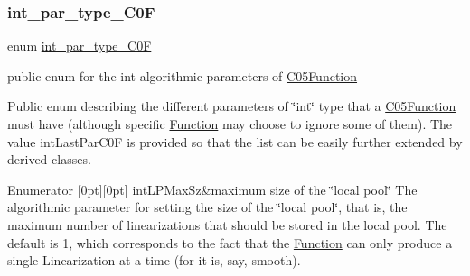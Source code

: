 \subsubsection{\texorpdfstring{int\+\_\+par\+\_\+type\+\_\+\+C0F}{int\_par\_type\_C0F}}
{\footnotesize\ttfamily enum \mbox{\hyperlink{class_s_m_spp__di__unipi__it_1_1_c05_function_acb8f83def674aa9de3dcc44cdcebc59d}{int\+\_\+par\+\_\+type\+\_\+\+C0F}}}



public enum for the int algorithmic parameters of \mbox{\hyperlink{class_s_m_spp__di__unipi__it_1_1_c05_function}{C05\+Function}} 

Public enum describing the different parameters of \char`\"{}int\char`\"{} type that a \mbox{\hyperlink{class_s_m_spp__di__unipi__it_1_1_c05_function}{C05\+Function}} must have (although specific \mbox{\hyperlink{class_s_m_spp__di__unipi__it_1_1_function}{Function}} may choose to ignore some of them). The value int\+Last\+Par\+C0F is provided so that the list can be easily further extended by derived classes. \begin{DoxyEnumFields}{Enumerator}
[0pt][0pt]{}\mbox{\label{class_s_m_spp__di__unipi__it_1_1_c05_function_acb8f83def674aa9de3dcc44cdcebc59da6c138f0bdc2cb4c33be9d3ea488a5cf3}} 
int\+L\+P\+Max\+Sz&maximum size of the \char`\"{}local pool\char`\"{} The algorithmic parameter for setting the size of the \char`\"{}local pool\char`\"{}, that is, the maximum number of linearizations that should be stored in the local pool. The default is 1, which corresponds to the fact that the \mbox{\hyperlink{class_s_m_spp__di__unipi__it_1_1_function}{Function}} can only produce a single Linearization at a time (for it is, say, smooth). \\
\hline


\end{DoxyEnumFields}
